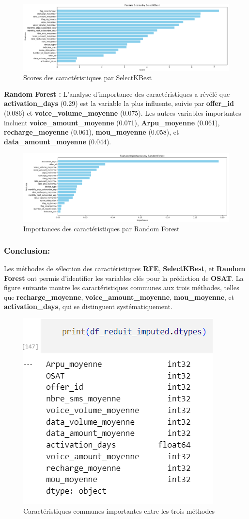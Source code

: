 \begin{figure}[H]
    \centering
    \includegraphics[width=0.8\linewidth]{capture_sas_66.png}
    \caption{Scores des caractéristiques par SelectKBest}
\end{figure}

\textbf{Random Forest :} L'analyse d'importance des caractéristiques a révélé que \textbf{activation\_days} (0.29) est la variable la plus influente, suivie par \textbf{offer\_id} (0.086) et \textbf{voice\_volume\_moyenne} (0.075). Les autres variables importantes incluent \textbf{voice\_amount\_moyenne} (0.071), \textbf{Arpu\_moyenne} (0.061), \textbf{recharge\_moyenne} (0.061), \textbf{mou\_moyenne} (0.058), et \textbf{data\_amount\_moyenne} (0.044).

\begin{figure}[H]
    \centering
    \includegraphics[width=0.8\linewidth]{capture_sas_67.png}
    \caption{Importances des caractéristiques par Random Forest}
\end{figure}


\subsubsection*{Conclusion:}
Les méthodes de sélection des caractéristiques \textbf{RFE}, \textbf{SelectKBest}, et \textbf{Random Forest} ont permis d'identifier les variables clés pour la prédiction de \textbf{OSAT}. La figure suivante montre les caractéristiques communes aux trois méthodes, telles que \textbf{recharge\_moyenne}, \textbf{voice\_amount\_moyenne}, \textbf{mou\_moyenne}, et \textbf{activation\_days}, qui se distinguent systématiquement.

\begin{figure}[H]
    \centering
    \includegraphics[width=0.4\linewidth]{capture_sas_69.png}
    \caption{Caractéristiques communes importantes entre les trois méthodes}
\end{figure}

